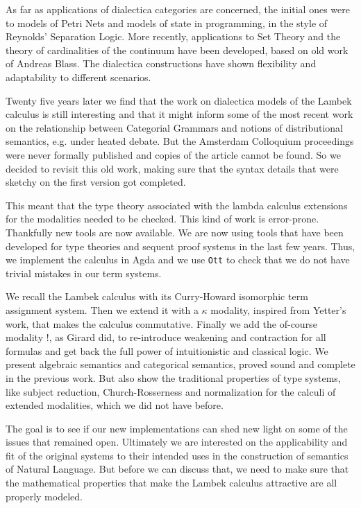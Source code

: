 \documentclass{article}
\begin{document}
As far as applications of dialectica categories are concerned, the initial ones were to models of Petri Nets and models of state in programming, in the style of Reynolds' Separation Logic. More recently, applications to Set Theory and the theory of cardinalities of the continuum have been developed, based on old work of Andreas Blass. The dialectica constructions have shown flexibility and adaptability to different scenarios.
\fi  

Twenty five years later we find that the work on dialectica models of the Lambek calculus is still interesting and that it might inform some of the most recent work on the relationship between Categorial Grammars and notions of distributional semantics, e.g. \cite{coecke2013} under heated debate. But the Amsterdam Colloquium proceedings were never formally published and copies of the article cannot be found. So we decided to revisit this old work, making sure that the syntax details that were sketchy on the first version got completed.


This meant that the type theory associated with the lambda calculus extensions for the modalities needed to be checked. This kind of work is error-prone. Thankfully new tools are now available. We are now using  tools that have been developed for type theories and sequent proof systems in the last few years. Thus, we implement the calculus in Agda
\cite{bove2009} and we use
\texttt{Ott} \cite{Sewell:2010} to check that we do not have trivial
mistakes in our term systems.

We recall the Lambek calculus with its Curry-Howard isomorphic term assignment system. Then we extend it with a $\kappa$ modality, inspired from Yetter's work, that makes the calculus commutative. Finally we add the of-course modality $!$,  as Girard did, to  re-introduce weakening and contraction for all formulas and get back the full power of intuitionistic and classical logic. We present algebraic semantics and categorical semantics, proved sound and complete in the previous work. But also show the traditional properties of type systems, like subject reduction, Church-Rosserness and  normalization for the calculi of extended modalities, which we did not have before.

The goal is to see if our new
implementations can shed new light on some of the issues that remained
open. Ultimately we are  interested on the applicability and fit of the original systems to their intended uses in the construction of semantics of Natural Language. But before we can discuss that, we need to make sure that the mathematical properties that make the Lambek calculus attractive are all properly modeled. 




\end{document}
